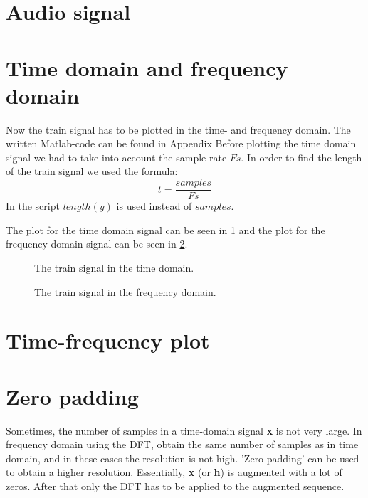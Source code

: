 \documentclass[final]{scrreprt} %
\begin{document}
\section{Audio signal}

\section{Time domain and frequency domain}
Now the train signal has to be plotted in the time- and frequency domain.
The written Matlab-code can be found in Appendix %
Before plotting the time domain signal we had to take into account the sample rate $Fs$.
In order to find the length of the train signal we used the formula:
\begin{equation}
t = \frac{samples}{Fs}
\end{equation}
In the script $length(y)$ is used instead of $samples$.

The plot for the time domain signal can be seen in \ref{fig:timedomain} and the plot for the frequency domain signal can be seen in \ref{fig:freqdomain}.

\begin{figure}[H]
	\centering
	\setlength\figureheight{6cm}
    	\setlength\figurewidth{6cm}
	
	\caption{The train signal in the time domain.}
	\label{fig:timedomain}
\end{figure}


\begin{figure}[H]
	\centering
	\setlength\figureheight{6cm}
  	\setlength\figurewidth{6cm}
	
	\caption{The train signal in the frequency domain.}
	\label{fig:freqdomain}
\end{figure}


\section{Time-frequency plot}

\section{Zero padding}
Sometimes, the number of samples in a time-domain signal \textbf{x} is not very large. 
In frequency domain using the DFT, obtain the same number of samples as in time domain, and in these cases the resolution is not high.
'Zero padding' can be used to obtain a higher resolution.
Essentially, \textbf{x} (or \textbf{h}) is augmented with a lot of zeros.
After that only the DFT has to be applied to the augmented sequence. 
\end{document}
